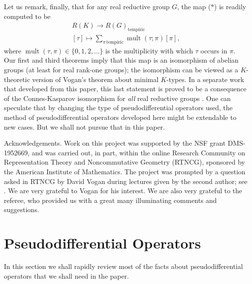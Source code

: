 \documentclass[leqno,11pt]{amsart}
\numberwithin{equation}{subsection}
\theoremstyle{plain}
\theoremstyle{definition}
\theoremstyle{remark}
\begin{document}
Let us remark, finally, that  for any real reductive group  $G$, the map ($*$) is readily computed to be
\[
\begin{gathered} 
R(K)\longrightarrow R(G)_{\mathrm{tempiric}}
\\
[\tau]\longmapsto \sum _{\pi\,\mathrm{tempiric}} \operatorname{mult}(\tau; \pi) [\pi] ,
\end{gathered}
\]
where $\operatorname{mult}(\tau, \pi)\in \{0,1,2,\dots\}$ is the multiplicity with which $\tau$ occurs in  $\pi$. Our first and third theorems imply that this map is an isomorphism of abelian groups (at least for real rank-one groups);  the isomorphism can be viewed as a $K$-theoretic version of Vogan's theorem about minimal $K$-types. In a separate work that developed from this paper, this last statement is proved to be a consequence of the Connes-Kasparov isomorphism for \emph{all} real reductive  groups \cite{BraddHigsonYuncken24}.
One can speculate that  by changing  the  type of pseudodifferential operators used,  the method of pseudodifferential operators developed here might be  extendable to new cases. But we shall not pursue that in this paper.

 


 {\sc Acknowledgements.} 
Work on this project was supported by  the NSF grant DMS-1952669, and  was carried out, in part, within the online Research Community on Representation Theory and Noncommutative Geometry (RTNCG),  sponsored by the American Institute of Mathematics.  The project was prompted by a question asked in RTNCG by David Vogan during  lectures given by the second author; see \cite{HigsonRTNCG22}. We are very grateful to Vogan  for his interest. We are also very grateful to the referee, who provided us with a great many illuminating comments and suggestions.



\section{Pseudodifferential Operators}
\label{sec-pseudodifferential-ops}

In this section we shall rapidly review most of the facts about pseudodifferential operators that we shall need in the paper.
\end{document}
